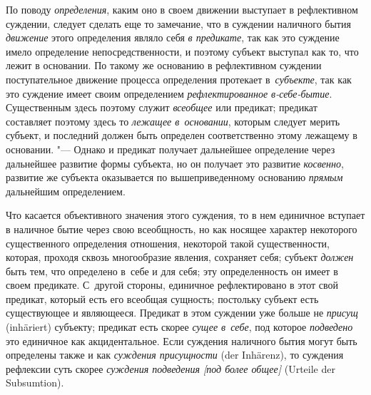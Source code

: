 По поводу {\em определения}, каким оно в своем движении выступает в
рефлективном суждении, следует сделать еще то замечание, что в суждении
наличного бытия {\em движение} этого определения являло себя {\em в предикате},
так как это суждение имело определение непосредственности, и поэтому субъект
выступал как то, что лежит в основании. По такому же основанию в рефлективном
суждении поступательное движение процесса определения протекает
в~{\em субъекте}, так как это суждение имеет своим определением
{\em рефлектированное в-себе-бытие}. Существенным здесь поэтому служит {\em
всеобщее} или предикат; предикат составляет поэтому здесь то {\em лежащее
в~основании}, которым следует мерить субъект, и последний должен быть определен
соответственно этому лежащему в основании. "--- Однако и предикат получает
дальнейшее определение через дальнейшее развитие формы субъекта, но он получает
это развитие {\em косвенно}, развитие же субъекта оказывается по
вышеприведенному основанию {\em прямым} дальнейшим определением.

Что касается объективного значения этого суждения, то в нем
единичное вступает в наличное бытие через свою всеобщность, но как носящее
характер некоторого существенного определения отношения, некоторой такой
существенности, которая, проходя сквозь многообразие явления, сохраняет
себя; субъект {\em должен} быть тем, что определено в~себе и для себя; эту
определенность он имеет в своем предикате. С~другой стороны, единичное
рефлектировано в этот свой предикат, который есть его всеобщая сущность;
постольку субъект есть существующее и являющееся. Предикат в этом суждении
уже больше не {\em присущ} (inhäriert) субъекту; предикат есть скорее
{\em сущее в~себе}, под которое {\em подведено} это единичное как
акцидентальное. Если суждения наличного бытия могут быть определены также
и как {\em суждения присущности} (der Inhärenz), то суждения рефлексии суть
скорее {\em суждения подведения [под более общее]} (Urteile der Subsumtion).

